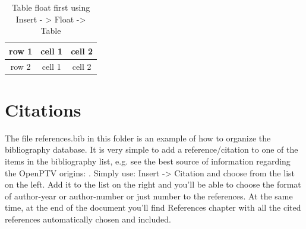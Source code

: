 \begin{table}
\begin{tabular}{|c|c|c|}
\hline 
row 1 & cell 1 & cell 2\tabularnewline
\hline 
\hline 
row 2 & cell 1 & cell 2\tabularnewline
\hline 
\end{tabular}

\protect\caption{Table float first using Insert - > Float -> Table}


\end{table}

\section{Citations}

The file references.bib in this folder is an example of how to organize
the bibliography database. It is very simple to add a reference/citation
to one of the items in the bibliography list, e.g. see the best source
of information regarding the OpenPTV origins: \citet{Dracos1996}.
Simply use: Insert -> Citation and choose from the list on the left.
Add it to the list on the right and you'll be able to choose the format
of author-year or author-number or just number to the references.
At the same time, at the end of the document you'll find References
chapter with all the cited references automatically chosen and included. 
